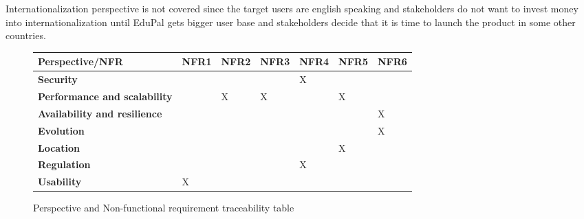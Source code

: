 Internationalization perspective is not covered since the target users are english speaking and stakeholders do not want to invest money into internationalization until EduPal gets bigger user base and stakeholders decide that it is time to launch the product in some other countries.

\begin{figure}[H]
    \centering
    \begin{tabular}{|l|l|l|l|l|l|l|}
    \hline
        \textbf{Perspective/NFR} & \textbf{NFR1} & \textbf{NFR2} & \textbf{NFR3} & \textbf{NFR4} & \textbf{NFR5} & \textbf{NFR6} \\ \hline
        \textbf{Security} & ~ & ~ & ~ & X & ~ & ~ \\ \hline
        \textbf{Performance and scalability} & ~ & X & X & ~ & X & ~ \\ \hline
        \textbf{Availability and resilience} & ~ & ~ & ~ & ~ & ~ & X \\ \hline
        \textbf{Evolution} & ~ & ~ & ~ & ~ & ~ & X \\ \hline
        \textbf{Location} & ~ & ~ & ~ & ~ & X & ~ \\ \hline
        \textbf{Regulation} & ~ & ~ & ~ & X & ~ & ~ \\ \hline
        \textbf{Usability} & X & ~ & ~ & ~ & ~ & ~ \\ \hline
    \end{tabular}
    \caption{Perspective and Non-functional requirement traceability table}
    \label{fig:perspective-to-non-func}
\end{figure}
